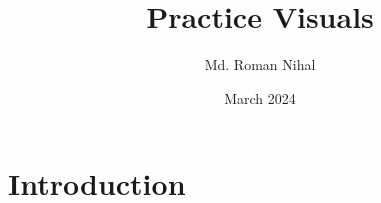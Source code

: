 \documentclass{article}
\title{Practice Visuals}
\author{Md. Roman Nihal}
\date{March 2024}
\begin{document}
\maketitle

\section{Introduction}
\end{document}
